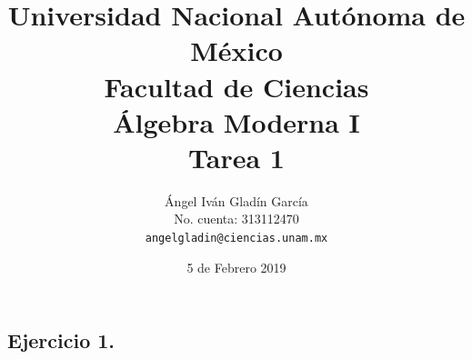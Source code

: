 \documentclass[11pt,letterpaper]{article}
\begin{document}
\title{
        Universidad Nacional Autónoma de México\\
        Facultad de Ciencias\\
        Álgebra Moderna I\\
    \vspace{.5cm}
    \large
        \textbf{Tarea 1}
}
\author{
    Ángel Iván Gladín García\\
    No. cuenta: 313112470\\
    \texttt{angelgladin@ciencias.unam.mx}
}
\date{5 de Febrero 2019}
\maketitle

\newtheorem{theorem}{Teorema}
\newtheorem{example}{Ejemplo}
\newtheorem{corollary}{Corolario}
\newtheorem{lemma}{Lemma}
\newtheorem{definition}{Definicion}
\newtheorem{prop}{Proposicion}

\subsection*{Ejercicio 1.}
\end{document}
